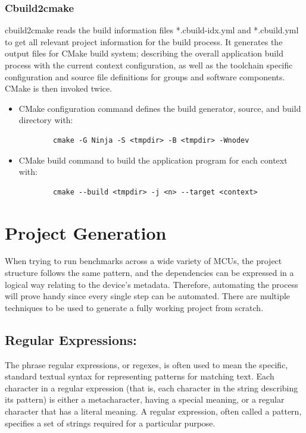 \subsubsection{Cbuild2cmake}
cbuild2cmake reads the build information files *.cbuild-idx.yml and *.cbuild.yml to get all relevant project information for the build process. It generates the  output files for CMake build system; describing the overall application build process with the current context configuration, as well as the toolchain specific configuration and source file definitions for groups and software components. CMake is then invoked twice.
\begin{itemize}
    \item
    CMake configuration command defines the build generator, source, and build directory with:
    \begin{lstlisting}
        cmake -G Ninja -S <tmpdir> -B <tmpdir> -Wnodev
    \end{lstlisting}
    \item
    CMake build command to build the application program for each context with:
    \begin{lstlisting}
        cmake --build <tmpdir> -j <n> --target <context>
    \end{lstlisting}
\end{itemize}

\section{Project Generation}
When trying to run benchmarks across a wide variety of MCUs, the project structure follows the same pattern, and the dependencies can be expressed in a logical way relating to the device's metadata.
Therefore, automating the process will prove handy since every single step can be automated.
There are multiple techniques to be used to generate a fully working project from scratch.
\subsection{Regular Expressions:}
    The phrase regular expressions, or regexes, is often used to mean the specific, standard textual syntax for representing patterns for matching text. Each character in a regular expression (that is, each character in the string describing its pattern) is either a metacharacter, having a special meaning, or a regular character that has a literal meaning.
    A regular expression, often called a pattern, specifies a set of strings required for a particular purpose. 
